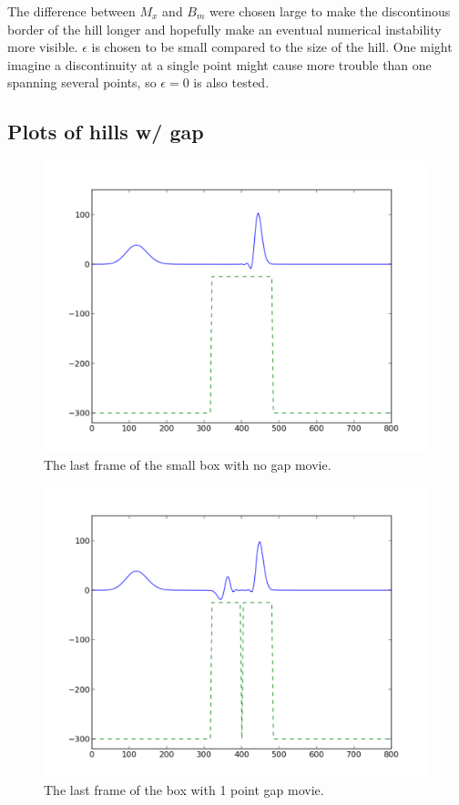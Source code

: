 \documentclass[twoside]{article}
\begin{document}
The difference between $M_x$ and $B_m$ were chosen large to make the discontinous border of the hill longer and hopefully make an eventual numerical instability more visible. $\epsilon$ is chosen to be small compared to the size of the hill. One might imagine a discontinuity at a single point might cause more trouble than one spanning several points, so $\epsilon = 0$ is also tested.

\subsection{Plots of hills w/ gap}
\begin{figure} 
  \centering
  \includegraphics[scale=0.4]{PdfImages/1d_box_final.pdf}
  \caption{The last frame of the small box with no gap movie.} \label{fig:box_1d_small}
\end{figure}

\begin{figure} 
  \centering
  \includegraphics[scale=0.4]{PdfImages/1d_box_slit1_final.pdf}
  \caption{The last frame of the box with 1 point gap movie.} \label{fig:box_1d_}
\end{figure}
\end{document}
